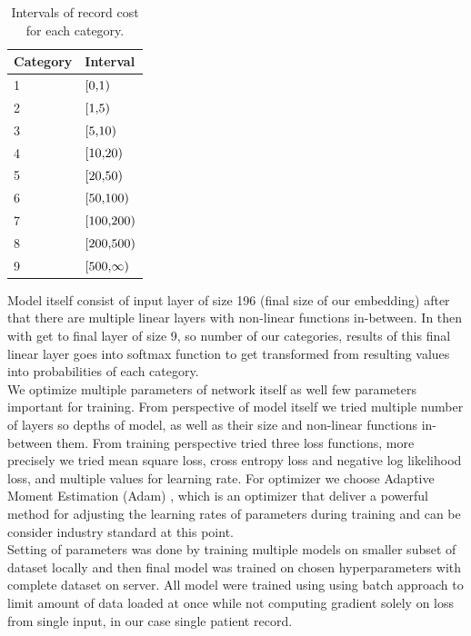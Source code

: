 \begin{table}[!h]
	\centering
	\begin{tabular}{|l|l|}
		\hline
		Category  & Interval \\ \hline
		1 & $\interval[{0,1})$ \\ \hline
		2 & $\interval[{1,5})$ \\ \hline
		3 & $\interval[{5,10})$ \\ \hline
		4 & $\interval[{10,20})$ \\ \hline
		5 & $\interval[{20,50})$ \\ \hline
		6 & $\interval[{50,100})$ \\ \hline
		7 & $\interval[{100,200})$ \\ \hline
		8 & $\interval[{200,500})$ \\ \hline
		9 & $\interval[{500,\infty})$ \\ \hline
	\end{tabular}
	\caption{Intervals of record cost for each category.}
	\label{tab:cat_interval_record}
\end{table}  

Model itself consist of input layer of size 196 (final size of our embedding) after that there are multiple linear layers with non-linear functions in-between. In then with get to final layer of size 9, so number of our categories, results of this final linear layer goes into softmax function to get transformed from resulting values into probabilities of each category. 
\\

We optimize multiple parameters of network itself as well few parameters important for training. From perspective of model itself we tried multiple number of layers so depths of model, as well as their size and non-linear functions in-between them. From training perspective tried three loss functions, more precisely we tried mean square loss, cross entropy loss and negative log likelihood loss, and multiple values for learning rate. For optimizer we choose Adaptive Moment Estimation (Adam) \cite{adam}, which is an optimizer that deliver a powerful method for adjusting the learning rates of parameters during training and can be consider industry standard at this point.  
\\

Setting of parameters was done by training multiple models on smaller subset of dataset locally and then final model was trained on chosen hyperparameters with complete dataset on server. All model were trained using using batch approach to limit amount of data loaded at once while not computing gradient solely on loss from single input, in our case single patient record.